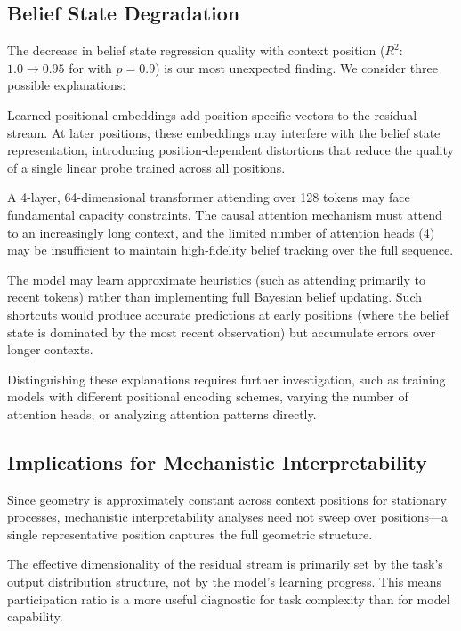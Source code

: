 \subsection{Belief State Degradation}

The decrease in belief state regression quality with context position ($R^2$: $1.0 \to 0.95$ for \messthree with $p = 0.9$) is our most unexpected finding. We consider three possible explanations:

Learned positional embeddings add position-specific vectors to the residual stream. At later positions, these embeddings may interfere with the belief state representation, introducing position-dependent distortions that reduce the quality of a single linear probe trained across all positions.

A 4-layer, 64-dimensional transformer attending over 128 tokens may face fundamental capacity constraints. The causal attention mechanism must attend to an increasingly long context, and the limited number of attention heads (4) may be insufficient to maintain high-fidelity belief tracking over the full sequence.

The model may learn approximate heuristics (such as attending primarily to recent tokens) rather than implementing full Bayesian belief updating. Such shortcuts would produce accurate predictions at early positions (where the belief state is dominated by the most recent observation) but accumulate errors over longer contexts.

Distinguishing these explanations requires further investigation, such as training models with different positional encoding schemes, varying the number of attention heads, or analyzing attention patterns directly.

\subsection{Implications for Mechanistic Interpretability}

Since geometry is approximately constant across context positions for stationary processes, mechanistic interpretability analyses need not sweep over positions---a single representative position captures the full geometric structure.

The effective dimensionality of the residual stream is primarily set by the task's output distribution structure, not by the model's learning progress. This means participation ratio is a more useful diagnostic for task complexity than for model capability.

